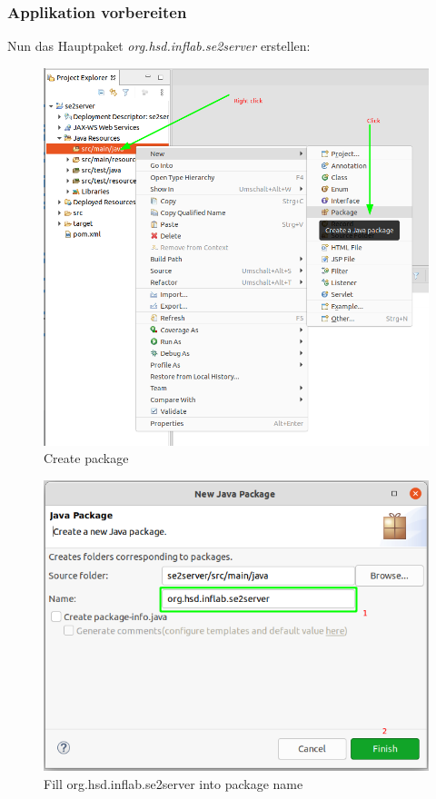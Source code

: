 \documentclass[11pt]{scrartcl}
\begin{document}
\subsubsection{Applikation vorbereiten}
\label{sec:applicationprep}
Nun das Hauptpaket \textit{org.hsd.inflab.se2server} erstellen:
\begin{figure}[!ht]
    \includegraphics[width=\linewidth]{images/eclipse07_create_package.png}
    \caption{Create package}
    \label{fig:createpackage}
\end{figure}

\newpage
\begin{figure}[!ht]
    \includegraphics[width=\linewidth]{images/eclipse08_create_package2.png}
    \caption{Fill org.hsd.inflab.se2server into package name}
    \label{fig:createpackage2}
\end{figure}
\end{document}
